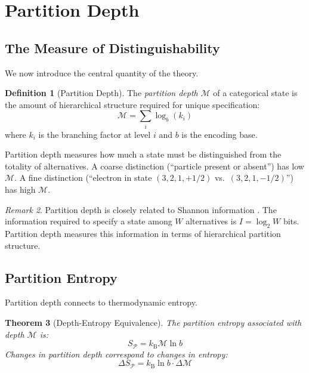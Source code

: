 ﻿\documentclass[twocolumn,10pt,a4paper]{article}
\newtheorem{theorem}{Theorem}[section]
\theoremstyle{definition}
\newtheorem{definition}[theorem]{Definition}
\theoremstyle{remark}
\newtheorem{remark}[theorem]{Remark}
\newcommand{\kB}{k_{\mathrm{B}}}
\newcommand{\Depth}{\mathcal{M}}
\newcommand{\Part}{\mathcal{P}}
\begin{document}
\section{Partition Depth}
\label{sec:depth}

\subsection{The Measure of Distinguishability}

We now introduce the central quantity of the theory.

\begin{definition}[Partition Depth]
\label{def:depth}
The \emph{partition depth} $\Depth$ of a categorical state is the amount of hierarchical structure required for unique specification:
\begin{equation}
    \Depth = \sum_{i} \log_b(k_i)
\end{equation}
where $k_i$ is the branching factor at level $i$ and $b$ is the encoding base.
\end{definition}

Partition depth measures how much a state must be distinguished from the totality of alternatives. A coarse distinction (``particle present or absent'') has low $\Depth$. A fine distinction (``electron in state $(3, 2, 1, +1/2)$ vs.\ $(3, 2, 1, -1/2)$'') has high $\Depth$.

\begin{remark}
Partition depth is closely related to Shannon information \citep{shannon1948}. The information required to specify a state among $W$ alternatives is $I = \log_2 W$ bits. Partition depth measures this information in terms of hierarchical partition structure.
\end{remark}

\subsection{Partition Entropy}

Partition depth connects to thermodynamic entropy.

\begin{theorem}[Depth-Entropy Equivalence]
\label{thm:entropy}
The partition entropy associated with depth $\Depth$ is:
\begin{equation}
    S_{\Part} = \kB \Depth \ln b
\end{equation}
Changes in partition depth correspond to changes in entropy:
\begin{equation}
    \Delta S_{\Part} = \kB \ln b \cdot \Delta\Depth
\end{equation}
\end{theorem}
\end{document}
